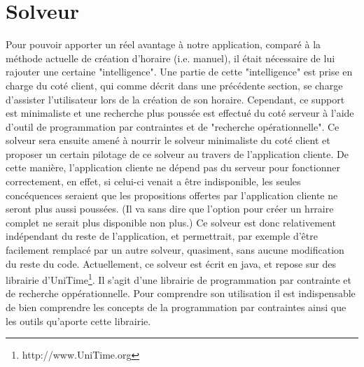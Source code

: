\chapter{Solveur}




Pour pouvoir apporter un réel avantage à notre application, comparé à la méthode actuelle de création d'horaire (i.e. manuel), il était nécessaire de lui rajouter une certaine "intelligence". 
Une partie de cette "intelligence" est prise en charge du coté client, qui comme décrit dans une précédente section, se charge d'assister l'utilisateur lors de la création de son horaire.
\newline
\indent
Cependant, ce support est minimaliste et une recherche plus poussée est effectué du coté serveur à l'aide d'outil de programmation par contraintes et de "recherche opérationnelle".  Ce solveur sera ensuite amené à nourrir le solveur minimaliste du coté client et proposer un certain pilotage de ce solveur au travers de l'application cliente. 
De cette manière, l'application cliente ne dépend pas du serveur pour fonctionner correctement, en effet, si celui-ci venait a être indisponible, les seules concéquences seraient que les propositions offertes par l'application cliente ne seront plus aussi poussées. (Il va sans dire que l'option pour créer un hrraire complet ne serait plus disponible non plus.)
\newline
\indent
Ce solveur est donc relativement indépendant du reste de l'application, et permettrait, par exemple d'être facilement remplacé par un autre solveur, quasiment, sans aucune modification du reste du code.
Actuellement, ce solveur est écrit en java, et repose sur des librairie d'UniTime\footnote{http://www.UniTime.org}. Il s'agit d'une librairie de programmation par contrainte et de recherche oppérationnelle.  Pour comprendre son utilisation il est indispensable de bien comprendre les concepts de la programmation par contraintes ainsi que les outils qu'aporte cette librairie.

